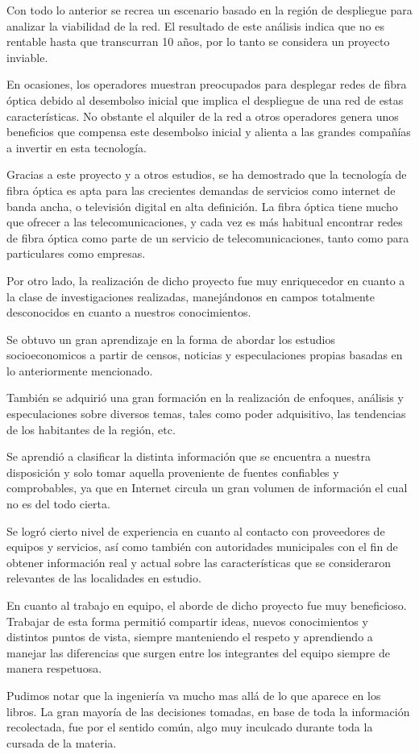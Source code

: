 Con todo lo anterior se recrea un escenario basado en la región de despliegue para analizar la viabilidad de la red. El resultado de este análisis indica que no es rentable hasta que transcurran 10 años, por lo tanto se considera un proyecto inviable.

En ocasiones, los operadores muestran preocupados para desplegar redes de fibra óptica debido al desembolso inicial que implica el despliegue de una red de estas características. No obstante el alquiler de la red a otros operadores genera unos beneficios que compensa este desembolso inicial y alienta a las grandes compañías a
invertir en esta tecnología.

Gracias a este proyecto y a otros estudios, se ha demostrado que la tecnología de fibra óptica es apta para las crecientes demandas de servicios como internet de banda ancha, o televisión digital en alta definición. La fibra óptica tiene mucho que ofrecer a las telecomunicaciones, y cada vez es más habitual encontrar redes de fibra óptica como parte de un servicio de telecomunicaciones, tanto como para particulares como empresas. 



Por otro lado, la realización de dicho proyecto fue muy enriquecedor en cuanto a la clase de investigaciones realizadas, manejándonos en campos totalmente desconocidos en cuanto a nuestros conocimientos. 

Se obtuvo un gran aprendizaje en la forma de abordar los estudios socioeconomicos a partir de censos, noticias y especulaciones propias basadas en lo anteriormente mencionado.


También se adquirió una gran formación en la realización de enfoques, análisis y especulaciones sobre diversos temas, tales como  poder adquisitivo, las tendencias de los habitantes de la región, etc. 

Se aprendió a clasificar la distinta información que se encuentra a nuestra disposición y solo tomar aquella proveniente de fuentes confiables y comprobables, ya que en Internet circula un gran volumen de información el cual no es del todo cierta.
 
Se logró cierto nivel de experiencia en cuanto al contacto con proveedores de equipos y servicios, así como también con autoridades municipales con el fin de obtener información real y actual sobre las características que se consideraron relevantes de las localidades en estudio.

En cuanto al trabajo en equipo, el aborde de dicho proyecto fue muy beneficioso. Trabajar de esta forma permitió compartir ideas, nuevos conocimientos y distintos puntos de vista, siempre manteniendo el respeto y aprendiendo a manejar las diferencias que surgen entre los integrantes del equipo siempre de manera respetuosa.

Pudimos notar que la ingeniería va mucho mas allá de lo que aparece en los libros. La gran mayoría de las decisiones tomadas, en base de toda la información recolectada, fue por el sentido común, algo muy inculcado durante toda la cursada de la materia.

